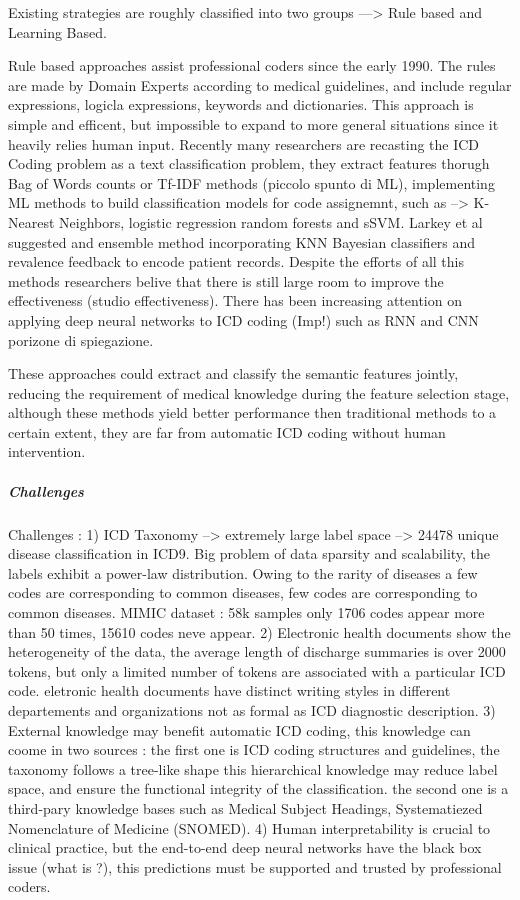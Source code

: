 Existing strategies are roughly classified into two groups ---> Rule based and Learning Based. 

Rule based approaches assist professional coders since the early 1990. The rules are made by Domain Experts 
according to medical guidelines, and include regular expressions, logicla expressions, keywords and dictionaries. 
This approach is simple and efficent, but impossible to expand to more general situations since it heavily 
relies human input. 
Recently many researchers are recasting the ICD Coding problem as a text classification problem, they 
extract features thorugh Bag of Words counts or Tf-IDF methods (piccolo spunto di ML), implementing ML methods 
to build classification models for code assignemnt, such as --> K-Nearest Neighbors, logistic regression 
random forests and sSVM. 
Larkey et al suggested and ensemble method incorporating KNN Bayesian classifiers and revalence feedback to encode 
patient records. 
Despite the efforts of all this methods researchers belive that there is still large room to improve the 
effectiveness (studio effectiveness). 
There has been increasing attention on applying deep neural networks to ICD coding (Imp!) such as RNN and CNN 
porizone di spiegazione. 

These approaches could extract and classify the semantic features jointly, reducing the requirement of medical
knowledge during the feature selection stage, although these methods yield better performance then traditional 
methods to a certain extent, they are far from automatic ICD coding without human intervention. 
\subparagraph{Challenges}
Challenges : 
1) ICD Taxonomy --> extremely large label space --> 24478 unique disease classification in ICD9. 
Big problem of data sparsity and scalability, the labels exhibit a power-law 
distribution. Owing to the rarity of diseases a few codes are corresponding to common 
diseases, few codes are corresponding to common diseases. 
MIMIC dataset : 58k samples only 1706 codes appear more than 50 times, 15610 codes neve appear. 
2) Electronic health documents show the heterogeneity of the data, the average length of discharge summaries 
is over 2000 tokens, but only a limited number of tokens are associated with a particular ICD code. 
eletronic health documents have distinct writing styles in different departements and organizations 
not as formal as ICD diagnostic description. 
3) External knowledge may benefit automatic ICD coding, this knowledge can coome in two sources : 
the first one is ICD coding structures and guidelines, the taxonomy follows a tree-like shape 
this hierarchical knowledge may reduce label space, and ensure the functional integrity of the classification. 
the second  one is a third-pary knowledge bases such as Medical Subject Headings, Systematiezed Nomenclature 
of Medicine (SNOMED). 
4) Human interpretability is crucial to clinical practice, but the end-to-end deep neural networks have 
the black box issue (what is ?), this predictions must be supported and trusted by professional coders. 
